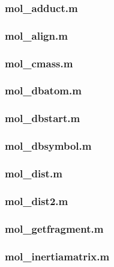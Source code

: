 \documentclass[a4paper]{article}
\begin{document}
\subsubsection{mol\_adduct.m%
  \label{mol-adduct-m}%
}


\subsubsection{mol\_align.m%
  \label{mol-align-m}%
}


\subsubsection{mol\_cmass.m%
  \label{mol-cmass-m}%
}


\subsubsection{mol\_dbatom.m%
  \label{mol-dbatom-m}%
}


\subsubsection{mol\_dbstart.m%
  \label{mol-dbstart-m}%
}


\subsubsection{mol\_dbsymbol.m%
  \label{mol-dbsymbol-m}%
}


\subsubsection{mol\_dist.m%
  \label{mol-dist-m}%
}


\subsubsection{mol\_dist2.m%
  \label{mol-dist2-m}%
}


\subsubsection{mol\_getfragment.m%
  \label{mol-getfragment-m}%
}


\subsubsection{mol\_inertiamatrix.m%
  \label{mol-inertiamatrix-m}%
}
\end{document}
